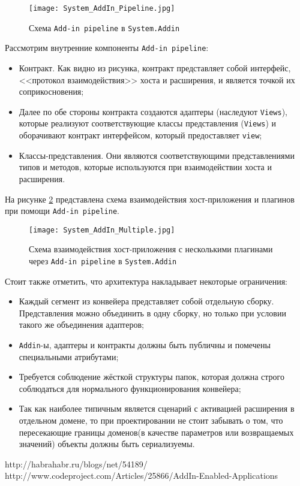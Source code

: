 \begin{figure}[!h]
    \centering
    \texttt{[image: System\_AddIn\_Pipeline.jpg]}
    \caption{Схема {\tt Add-in pipeline} в {\tt System.Addin}}
    \label{addin_pipeline-scheme}
\end{figure}

Рассмотрим внутренние компоненты {\tt Add-in pipeline}:

\begin{itemize}

  \item Контракт. Как видно из рисунка, контракт представляет собой интерфейс, <<протокол взаимодействия>> хоста и расширения, и является точкой их соприкосновения;

  \item Далее по обе стороны контракта создаются адаптеры (наследуют {\tt Views}), которые реализуют соответствующие классы представления ({\tt Views}) и оборачивают контракт интерфейсом, который предоставляет {\tt view};

  \item Классы-представления. Они являются соответствующими представлениями типов и методов, которые используются при взаимодействии хоста и расширения.

\end{itemize}

На рисунке \ref{addin_multiple-scheme} представлена схема взаимодействия хост-приложения и плагинов при помощи {\tt Add-in pipeline}.

\begin{figure}[!h]
    \centering
    \texttt{[image: System\_AddIn\_Multiple.jpg]}
    \caption{Схема взаимодействия хост-приложения с несколькими плагинами через {\tt Add-in pipeline} в {\tt System.Addin}}
    \label{addin_multiple-scheme}
\end{figure}

Стоит также отметить, что архитектура накладывает некоторые ограничения:
\begin{itemize}

  \item Каждый сегмент из конвейера представляет собой отдельную сборку. Представления можно объединить в одну сборку, но только при условии такого же объединения адаптеров;

  \item {\tt Addin}-ы, адаптеры и контракты должны быть публичны и помечены специальными атрибутами;

  \item Требуется соблюдение жёсткой структуры папок, которая должна строго соблюдаться для нормального функционирования конвейера;

  \item Так как наиболее типичным является сценарий с активацией расширения в отдельном домене, то при проектировании не стоит забывать о том, что пересекающие границы доменов(в качестве параметров или возвращаемых значений) объекты должны быть сериализуемы.

\end{itemize}

http://habrahabr.ru/blogs/net/54189/
http://www.codeproject.com/Articles/25866/AddIn-Enabled-Applications
